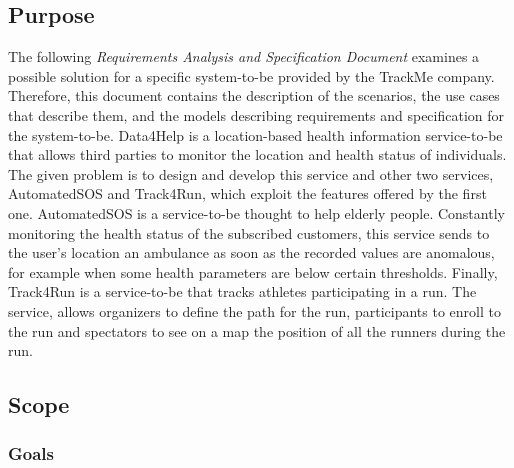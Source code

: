\subsection{Purpose} 
The following \textit{Requirements Analysis and Specification Document} examines a possible solution for a specific system-to-be provided by the TrackMe company. Therefore, this document contains the description of the scenarios, the use cases that describe them, and the models describing requirements and specification for the system-to-be.
\bigbreak
\noindent
Data4Help is a location-based health information service-to-be that allows third parties to monitor the location and health status of individuals. The given problem is to design and develop this service and other two services, AutomatedSOS and Track4Run, which exploit the features offered by the first one.
\bigbreak
\noindent
AutomatedSOS is a service-to-be thought to help elderly people. Constantly monitoring the health status of the subscribed customers, this service sends to the user's location an ambulance as soon as the recorded values are anomalous, for example when some health parameters are below certain thresholds.
\bigbreak
\noindent
Finally, Track4Run is a service-to-be that tracks athletes participating in a run. The service, allows organizers to define the path for the run, participants to enroll to the run and spectators to see on a map the position of all the runners during the run.
\subsection{Scope}
\subsubsection{Goals}

